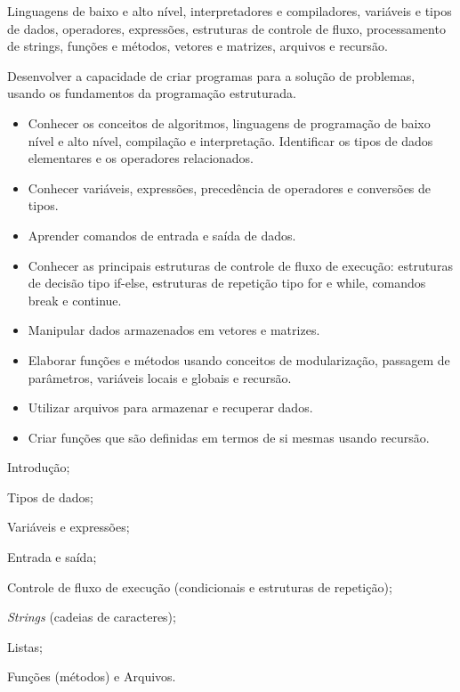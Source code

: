 	
	\begin{pud}
	
	
	\ementa
	Linguagens de baixo e alto nível, interpretadores e compiladores, variáveis e tipos de dados, operadores, expressões, estruturas de controle de fluxo, processamento de strings, funções e métodos, vetores e matrizes, arquivos e recursão.
	
	\objetivos	
	Desenvolver a capacidade de criar programas para a solução de problemas, usando os fundamentos da programação estruturada.
	
	\begin{itemize}
		\item  Conhecer os conceitos de algoritmos, linguagens de programação de baixo nível e alto nível, compilação e interpretação.
		Identificar os tipos de dados elementares e os operadores relacionados.
		
		\item Conhecer variáveis,  expressões, precedência de operadores e conversões de tipos.
		
		\item Aprender comandos de entrada e saída de dados.
		
		\item Conhecer as principais estruturas de controle de fluxo de execução: estruturas de decisão tipo if-else, estruturas de repetição tipo for e while, comandos break e continue.
		
		\item Manipular dados armazenados em vetores e matrizes.
		
		\item Elaborar funções e métodos usando conceitos de modularização, passagem de parâmetros, variáveis locais e globais e recursão.
		
		\item Utilizar arquivos para armazenar e recuperar dados.

		\item Criar funções que são definidas em termos de si mesmas usando recursão.
	\end{itemize}
	
	
	
	\programa	
	\begin{description}[itemsep=0em]
	   \item[UNIDADE I:] Introdução;
	    \item[UNIDADE II:] Tipos de dados;
	    \item[UNIDADE III:]  Variáveis e expressões;
	    \item[UNIDADE IV:]  Entrada e saída;
	    \item[UNIDADE V:]  Controle de fluxo de execução (condicionais e estruturas de repetição);
	    \item[UNIDADE VI:]  \textit{Strings} (cadeias de caracteres);
	    \item[UNIDADE VII:]  Listas;
	   \item[UNIDADE VIII:] Funções (métodos) e Arquivos.
	\end{description}
		

\end{pud}
